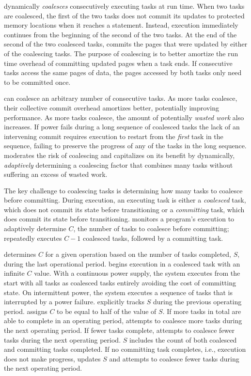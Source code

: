 \sys dynamically {\em coalesces} consecutively executing tasks at run time. When two tasks are coalesced, the first of the two tasks does not commit its updates to protected memory locations when it reaches a \transition statement. Instead, execution immediately continues from the beginning of the second of the two tasks. At the end of the second of the two coalesced tasks, \sys commits the pages that were updated by either of the coalescing tasks. The purpose of coalescing is to better amortize the run time overhead of committing updated pages when a task ends. If consecutive tasks access the same pages of data, the pages accessed by both tasks only need to be committed once.  

\sys can coalesce an arbitrary number of consecutive tasks. As more tasks coalesce, their collective commit overhead amortizes better, potentially improving performance. As more tasks coalesce, the amount of potentially {\em wasted work} also increases. If power fails during a long sequence of coalesced tasks the lack of an intervening commit requires execution to restart from the {\em first} task in the sequence, failing to preserve the progress of any of the tasks in the long sequence. \sys moderates the risk of coalescing and capitalizes on its benefit by dynamically, \emph{adaptively} determining a coalescing factor that combines many tasks without suffering an excess of wasted work. 

The key challenge to coalescing tasks is determining how many tasks to coalesce before committing. During execution, an executing task is either a {\em coalesced} task, which does not commit its state before transitioning or a {\em committing} task, which does commit its state before transitioning. \sys monitors a program's execution to adaptively determine $C$, the number of tasks to coalesce before committing; \sys repeatedly executes $C-1$ coalesced tasks, followed by a committing task.  

\sys determines $C$ for a given operation based on the number of tasks completed, $S$, during the last operational period. \sys begins execution in a coalesced task with an infinite $C$ value. With a continuous power supply, the system executes from the start with all tasks as coalesced tasks entirely avoiding the cost of committing state. On intermittent power, the system executes a sequence of tasks that is interrupted by a power failure. \sys explicitly tracks $S$ during the previous operating period. \sys assigns $C$ to be equal to half of the value of $S$. If more tasks in total are able to complete in an operating period, \sys attempts to coalesce more tasks during the next operating period. If fewer tasks complete, \sys attempts to coalesce fewer tasks during the next operating period. $S$ includes the count of both coalesced and committing tasks completed. If no committing task completes, i.e., execution does not make progress, \sys updates $S$ and attempts to coalesce fewer tasks during the next operating period.

